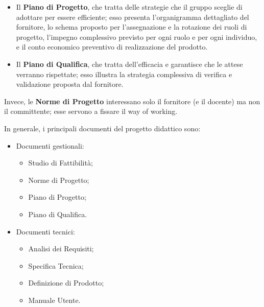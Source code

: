 \documentclass[a4paper]{article}
\begin{document}
	\begin{itemize}
		
			
	\item Il \textbf{Piano di Progetto}, che tratta delle strategie che il gruppo sceglie di adottare per essere efficiente; esso presenta l'organigramma dettagliato del fornitore, lo schema proposto per l'assegnazione e la rotazione dei ruoli di progetto, l'impegno complessivo previsto per ogni ruolo e per ogni individuo, e il conto economico preventivo di realizzazione del prodotto.
			
	\item Il \textbf{Piano di Qualifica}, che tratta dell'efficacia e garantisce che le attese verranno rispettate; esso illustra la strategia complessiva di verifica e validazione proposta dal fornitore.
		
	\end{itemize}

		
Invece, le \textbf{Norme di Progetto} interessano solo il fornitore (e il docente) ma non il committente; esse servono a fissare il way of working.
		
In generale, i principali documenti del progetto didattico sono:
		
	\begin{itemize}
		
			
	\item Documenti gestionali:
				
	\begin{itemize}
		
					
	\item Studio di Fattibilità;
					
	\item Norme di Progetto;
					
	\item Piano di Progetto;
					
	\item Piano di Qualifica.
				
	\end{itemize}

			
			
	\item Documenti tecnici:
				
	\begin{itemize}
		
					
	\item Analisi dei Requisiti;
					
	\item Specifica Tecnica;
					
	\item Definizione di Prodotto;
					
	\item Manuale Utente.
				
	\end{itemize}

			
		
	\end{itemize}
\end{document}
